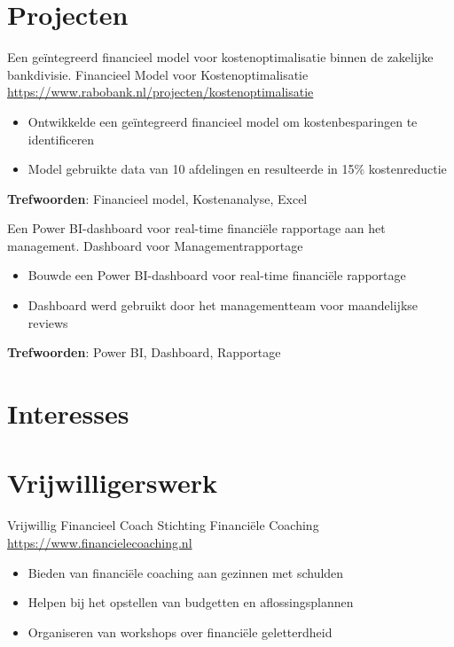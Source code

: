 \documentclass[a4paper, serif, 10pt]{moderncv}
\begin{document}
\section{Projecten}

        {Een geïntegreerd financieel model voor kostenoptimalisatie binnen de zakelijke bankdivisie.}
        {Financieel Model voor Kostenoptimalisatie}
        {\url{https://www.rabobank.nl/projecten/kostenoptimalisatie}}
        {}
        {\begin{itemize}
\item Ontwikkelde een geïntegreerd financieel model om kostenbesparingen te identificeren
\item Model gebruikte data van 10 afdelingen en resulteerde in 15\% kostenreductie
\end{itemize}
\textbf{Trefwoorden}: Financieel model, Kostenanalyse, Excel}

        {Een Power BI-dashboard voor real-time financiële rapportage aan het management.}
        {Dashboard voor Managementrapportage}
        {}
        {}
        {\begin{itemize}
\item Bouwde een Power BI-dashboard voor real-time financiële rapportage
\item Dashboard werd gebruikt door het managementteam voor maandelijkse reviews
\end{itemize}
\textbf{Trefwoorden}: Power BI, Dashboard, Rapportage}
\section{Interesses}

\section{Vrijwilligerswerk}

        {Vrijwillig Financieel Coach}
        {Stichting Financiële Coaching}
        {\url{https://www.financielecoaching.nl}}
        {}
        {\begin{itemize}
\item Bieden van financiële coaching aan gezinnen met schulden
\item Helpen bij het opstellen van budgetten en aflossingsplannen
\item Organiseren van workshops over financiële geletterdheid
\end{itemize}}
    
\end{document}
